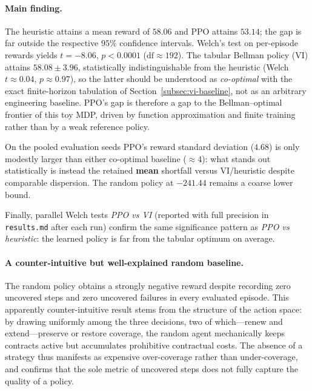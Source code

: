 \paragraph{Main finding.}
The heuristic attains a mean reward of $58.06$ and PPO attains $53.14$;
the gap is far outside the respective $95\%$ confidence intervals.
Welch's test on per-episode rewards yields $t = {-}8.06$, $p < 0.0001$
($\mathrm{df} \approx 192$). The tabular Bellman policy (VI) attains
$58.08 \pm 3.96$, statistically indistinguishable from the heuristic
(Welch $t \approx 0.04$, $p \approx 0.97$), so the latter should be
understood as \emph{co-optimal} with the exact finite-horizon tabulation
of Section~\ref{subsec:vi-baseline}, not as an arbitrary engineering
baseline. PPO's gap is therefore a gap to the Bellman--optimal frontier of
this toy MDP, driven by function approximation and finite training rather
than by a weak reference policy.

On the pooled evaluation seeds PPO's reward standard deviation
($4.68$) is only modestly larger than either co-optimal baseline
($\approx 4$): what stands out statistically is instead the retained
\textbf{mean} shortfall versus VI/heuristic despite comparable dispersion.
The random policy at $-241.44$ remains a coarse lower bound.

Finally, parallel Welch tests \emph{PPO vs VI} (reported with full
precision in \texttt{results.md} after each run) confirm the same
significance pattern as \emph{PPO vs heuristic}: the learned policy is
far from the tabular optimum on average.

\paragraph{A counter-intuitive but well-explained random baseline.}
The random policy obtains a strongly negative reward despite recording
zero uncovered steps and zero uncovered failures in every evaluated
episode. This apparently counter-intuitive result stems from the
structure of the action space: by drawing uniformly among the three
decisions, two of which---renew and extend---preserve or restore
coverage, the random agent mechanically keeps contracts active but
accumulates prohibitive contractual costs. The absence of a strategy
thus manifests as expensive over-coverage rather than under-coverage,
and confirms that the sole metric of uncovered steps does not fully
capture the quality of a policy.

